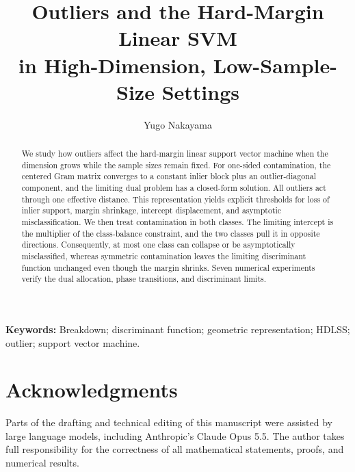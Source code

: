 \documentclass[11pt,a4paper]{amsart}
\title[Outliers and the Hard-Margin Linear SVM in HDLSS]{Outliers and the Hard-Margin Linear SVM\\in High-Dimension, Low-Sample-Size Settings}
\author{Yugo Nakayama}
\date{}
\numberwithin{equation}{section}
\theoremstyle{definition}
\theoremstyle{remark}
\begin{document}
\begin{abstract}
We study how outliers affect the hard-margin linear support vector machine when the dimension grows while the sample sizes remain fixed. For one-sided contamination, the centered Gram matrix converges to a constant inlier block plus an outlier-diagonal component, and the limiting dual problem has a closed-form solution. All outliers act through one effective distance. This representation yields explicit thresholds for loss of inlier support, margin shrinkage, intercept displacement, and asymptotic misclassification. We then treat contamination in both classes. The limiting intercept is the multiplier of the class-balance constraint, and the two classes pull it in opposite directions. Consequently, at most one class can collapse or be asymptotically misclassified, whereas symmetric contamination leaves the limiting discriminant function unchanged even though the margin shrinks. Seven numerical experiments verify the dual allocation, phase transitions, and discriminant limits.
\end{abstract}

\maketitle
\noindent\textbf{Keywords:} Breakdown; discriminant function; geometric representation; HDLSS; outlier; support vector machine.











\section*{Acknowledgments}
Parts of the drafting and technical editing of this manuscript were assisted by large language models, including Anthropic's Claude Opus 5.5. The author takes full responsibility for the correctness of all mathematical statements, proofs, and numerical results.



\end{document}

